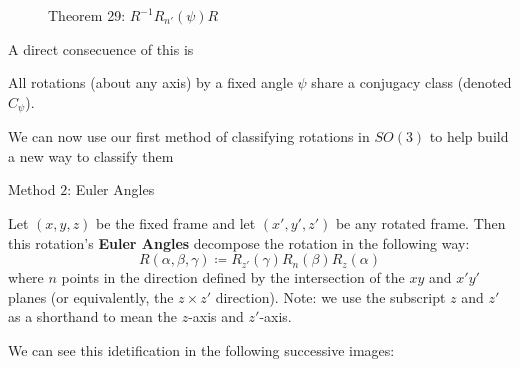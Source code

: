 \documentclass[compress,aspectratio=169,10pt,usenames,dvipsnames]{beamer}
\begin{document}
\begin{frame}
\begin{figure}[H]
\begin{tabular}{cccc}
	\end{tabular}
	\caption{Theorem 29: $R^{-1}R_{n'}(\psi)R$}
\end{figure}
\vfill
\end{frame}

\begin{frame}
\vfill
A direct consecuence of this is 
\vfill
\begin{theorem}
	All rotations (about any axis) by a fixed angle $\psi$ share a conjugacy class (denoted $C_\psi$).
\end{theorem}
\vfill
We can now use our first method of classifying rotations in $SO(3)$ to help build a new way to classify them
\end{frame}
%
%
\begin{frame}
\vfill
Method $2$: Euler Angles
\vfill
\begin{definition}
	Let $(x,y,z)$ be the fixed frame and let $(x',y',z')$ be any rotated frame. Then this rotation's \textbf{Euler Angles} decompose the rotation in the following way:
$$R(\alpha,\beta,\gamma) \coloneq R_{z'}(\gamma)R_n(\beta)R_z(\alpha)$$
where $n$ points in the direction defined by the intersection of the $xy$ and $x'y'$ planes (or equivalently, the $z\times z'$ direction). Note: we use the subscript $z$ and $z'$ as a shorthand to mean the $z$-axis and $z'$-axis.
\end{definition}
\vfill
We can see this idetification in the following successive images:
\end{frame}
\end{document}

